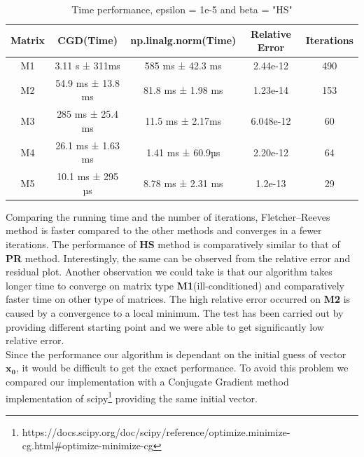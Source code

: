 \documentclass{article}
\numberwithin{equation}{section}
\begin{document}
\begin{table}[hbt!]
    \centering
    \begin{tabular}{||c c c c c||}
 \hline
 Matrix & CGD(Time) & np.linalg.norm(Time) & Relative Error & Iterations \\ [0.8ex] 
 \hline\hline
 M1 & 3.11 s ± 311ms & 585 ms ± 42.3 ms & 2.44e-12 & 490\\ 
 \hline
 M2 & 54.9 ms ± 13.8 ms & 81.8 ms ± 1.98 ms & 1.23e-14 & 153\\
 \hline
 M3 & 285 ms ± 25.4 ms & 11.5 ms ± 2.17ms  & 6.048e-12 & 60  \\
 \hline
 M4 & 26.1 ms ± 1.63 ms & 1.41 ms ± 60.9µs & 2.20e-12 & 64 \\
 \hline
  M5 & 10.1 ms ± 295 µs & 8.78 ms ± 2.31 ms & 1.2e-13 & 29 \\
 \hline
\end{tabular}
    \caption{Time performance, epsilon = 1e-5 and beta = "HS"}
    \label{tab:pr_table}
\end{table}

Comparing the running time and the number of iterations, Fletcher–Reeves method is faster compared to the other methods and converges in a fewer iterations. The performance of \textbf{HS} method is comparatively similar to that of \textbf{PR} method. Interestingly, the same can be observed from the relative error and residual plot. Another observation we could take is that our algorithm takes longer time to converge on matrix type \textbf{M1}(ill-conditioned) and comparatively faster time on other type of matrices. The high relative error occurred on \textbf{M2} is caused by a convergence to a local minimum. The test has been carried out by providing different starting point and we were able to get significantly low relative error.  \\

Since the performance our algorithm is dependant on the initial guess of vector \textbf{$\boldsymbol{x_0}$}, it would be difficult to get the exact performance. To avoid this problem we compared our implementation with a Conjugate Gradient method implementation of scipy\footnote{https://docs.scipy.org/doc/scipy/reference/optimize.minimize-cg.html\#optimize-minimize-cg} providing the same initial vector. \\
\end{document}

